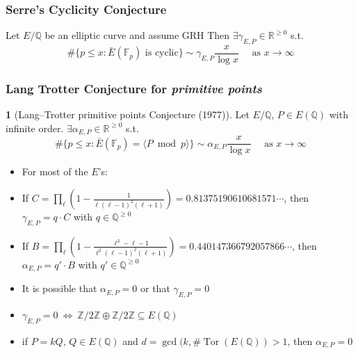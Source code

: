 \documentclass[12pt,handout]{beamer} %
\newcommand{\Q}{\mathbb Q}
\newcommand{\Z}{\mathbb Z}
\newcommand{\F}{\mathbb F}
\newcommand{\R}{\mathbb R}
\theoremstyle{definition}
\newtheorem{conj}[theorem]{\translate{Conjecture}}
\begin{document}
\begin{frame}
\frametitle{Serre's Cyclicity Conjecture} 

\begin{Theorem}
Let $E/\Q$ be an elliptic curve and assume GRH
Then $\exists \gamma_{E,P}\in\R^{\ge0}$ s.t.%
$$\#\{p\le x:  \bar{E}(\F_p)\text{ is cyclic}\}\sim\gamma_{E,P}\frac{x}{\log x}\quad\text{ as }x\rightarrow\infty$$
\end{Theorem}\pause


\frametitle{Lang Trotter Conjecture for \textit{primitive points}}
 
\begin{conj}[Lang--Trotter primitive points Conjecture (1977)] Let $E/\Q$, $P\in E(\Q)$ with infinite order.
$\exists \alpha_{E,P}\in\R^{\ge0}$ s.t.
$$\#\{p\le x:  \bar{E}(\F_p)=\langle P\bmod p\rangle\}\sim\alpha_{E,P}\frac{x}{\log x}\quad\text{ as }x\rightarrow\infty$$
\end{conj}\pause

\begin{itemize}[<+-|alert@+>]
\item[] For most of the $E$'s:
\item If $C=\prod_\ell\left(1-\frac1{\ell(\ell-1)^2(\ell+1)}\right)= 0.81375190610681571\cdots$, then $\gamma_{E,P}=q\cdot C$ with $q\in\Q^{\ge0}$ 
\item If $B=\prod_\ell\left(
1-\frac{\ell^3-\ell-1}{\ell^2(\ell-1)^2(\ell+1)}\right)=0.440147366792057866\cdots$, then  $\alpha_{E,P}=q'\cdot B$ with $q'\in\Q^{\ge0}$ 
\item It is possible that $\alpha_{E,P}=0$ or that $\gamma_{E,P}=0$
\item $\gamma_{E,P}=0\ \Longleftrightarrow\ \Z/2\Z\oplus\Z/2\Z\subseteq E(\Q)$
\item if $P=kQ$, $Q\in E(\Q)$ and $d=\gcd(k,\#\operatorname{Tor}(E(\Q))>1$, then $\alpha_{E,P}=0$
\end{itemize}
\end{frame}
\end{document}
